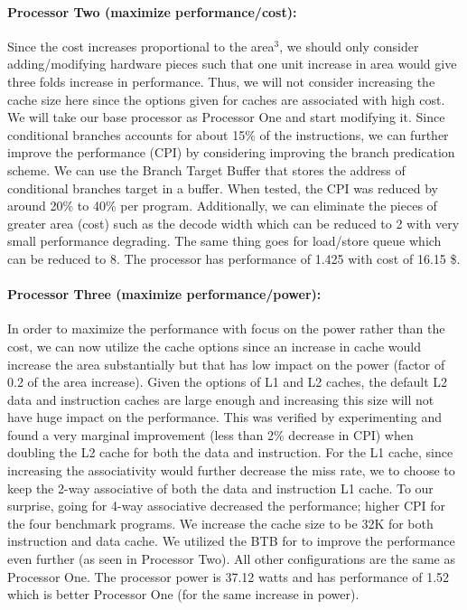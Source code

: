 \documentclass[12pt] {article}
\begin{document}
\paragraph{Processor Two (maximize performance/cost):} Since the cost increases proportional to the area$^{3}$, we should only consider adding/modifying hardware pieces such that one unit increase in area would give three folds increase in performance. Thus, we will not consider increasing the cache size here since the options given for caches are associated with high cost. We will take our base processor as Processor One and start modifying it. Since conditional branches accounts for about 15\% of the instructions, we can further improve the performance (CPI) by considering improving the branch predication scheme. We can use the Branch Target Buffer that stores the address of conditional branches target in a buffer. When tested, the CPI was reduced by around 20\% to 40\% per program. Additionally, we can eliminate the pieces of greater area (cost) such as the decode width which can be reduced to 2 with very small performance degrading. The same thing goes for load/store queue which can be reduced to 8. The processor has performance of 1.425 with cost of 16.15 \$. 

\paragraph{Processor Three (maximize performance/power):}
In order to maximize the performance with focus on the power rather than the cost, we can now utilize the cache options since an increase in cache would increase the area substantially but that has low impact on the power (factor of 0.2 of the area increase). Given the options of L1 and L2 caches, the default L2 data and instruction caches are large enough and increasing this size will not have huge impact on the performance. This was verified by experimenting and found a very marginal improvement (less than 2\% decrease in CPI) when doubling the L2 cache for both the data and instruction. For the L1 cache, since increasing the associativity would further decrease the miss rate, we to choose to keep the 2-way associative of both the data and instruction L1 cache. To our surprise, going for 4-way associative decreased the performance; higher CPI for the four benchmark programs. We increase the cache size to be 32K for both instruction and data cache. We utilized the BTB for to improve the performance even further (as seen in Processor Two). All other configurations are the same as Processor One. The processor power is 37.12 watts and has performance of 1.52 which is better Processor One (for the same increase in power). 

\end{document}
